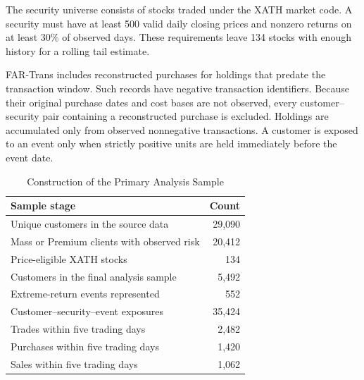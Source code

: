 \documentclass[conference]{IEEEtran}
\newcommand{\pct}{\%}
\begin{document}
The security universe consists of stocks traded under the XATH market code. A security must have at least 500 valid daily closing prices and nonzero returns on at least 30\pct{} of observed days. These requirements leave 134 stocks with enough history for a rolling tail estimate.

FAR-Trans includes reconstructed purchases for holdings that predate the transaction window. Such records have negative transaction identifiers. Because their original purchase dates and cost bases are not observed, every customer--security pair containing a reconstructed purchase is excluded. Holdings are accumulated only from observed nonnegative transactions. A customer is exposed to an event only when strictly positive units are held immediately before the event date.

\begin{table}[t]
\caption{Construction of the Primary Analysis Sample}
\label{tab:sample}
\centering
\footnotesize
\begin{tabular}{lr}
\toprule
Sample stage & Count \\
\midrule
Unique customers in the source data & 29,090 \\
Mass or Premium clients with observed risk & 20,412 \\
Price-eligible XATH stocks & 134 \\
Customers in the final analysis sample & 5,492 \\
Extreme-return events represented & 552 \\
Customer--security--event exposures & 35,424 \\
Trades within five trading days & 2,482 \\
Purchases within five trading days & 1,420 \\
Sales within five trading days & 1,062 \\
\bottomrule
\end{tabular}
\end{table}
\end{document}
